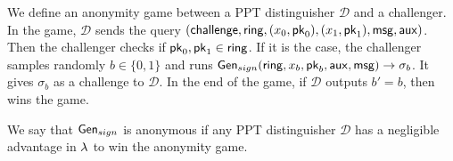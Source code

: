	\begin{definition}\label{def:anonymity}
		We define an anonymity game between a PPT distinguisher $ \mathcal{D} $ and a challenger.
		In the game, $\mathcal{D}$ sends the query  $ (\mathsf{challenge}, \mathsf{ring}, (x_0,\mathsf{pk}_0), (x_1, \mathsf{pk}_1), \mathsf{msg},\mathsf{aux})$. Then the challenger checks if  $ \mathsf{pk}_0, \mathsf{pk}_1 \in \mathsf{ring} $. If it is the case, the challenger samples randomly  $ b\in \{0,1\}  $ and runs $ \mathsf{Gen}_{sign}(\mathsf{ring}, x_b, \mathsf{pk}_b,\mathsf{aux}, \mathsf{msg}) \rightarrow \sigma_b $. It gives $ \sigma_b $ as a challenge to $ \mathcal{D} $. In the end of the game, if $ \mathcal{D} $ outputs $ b' = b $, then wins the game.
			
		We say that $ \mathsf{Gen}_{sign} $ is anonymous  if any PPT distinguisher $ \mathcal{D} $ has a negligible advantage in $ \lambda $ to win the anonymity game.
	\end{definition}
	
	
	
	
